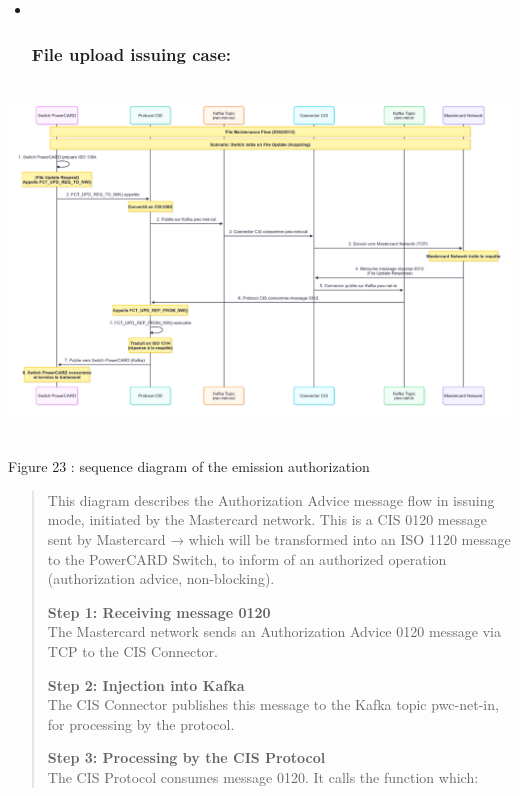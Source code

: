 \documentclass[12pt,a4paper]{report}
\begin{document}
\begin{itemize}
\item ~
  \hypertarget{file-upload-issuing-case}{%
  \subsubsection{\texorpdfstring{\textbf{File upload issuing
  case:}}{File upload issuing case:}}\label{file-upload-issuing-case}}
\end{itemize}

\includegraphics[width=5.99367in,height=3.71696in]{vertopal_d1b0b2209edd4c6aa8254f57daa0953b/media/image42.png}

\protect\hypertarget{_Toc201954499}{}{}Figure 23 : sequence diagram of
the emission authorization

\begin{quote}
This diagram describes the Authorization Advice message flow in issuing
mode, initiated by the Mastercard network. This is a CIS 0120 message
sent by Mastercard → which will be transformed into an ISO 1120 message
to the PowerCARD Switch, to inform of an authorized operation
(authorization advice, non-blocking).

\textbf{Step 1: Receiving message 0120}\\
The Mastercard network sends an Authorization Advice 0120 message via
TCP to the CIS Connector.

\textbf{Step 2: Injection into Kafka}\\
The CIS Connector publishes this message to the Kafka topic pwc-net-in,
for processing by the protocol.

\textbf{Step 3: Processing by the CIS Protocol}\\
The CIS Protocol consumes message 0120. It calls the function which:
\end{quote}
\end{document}
